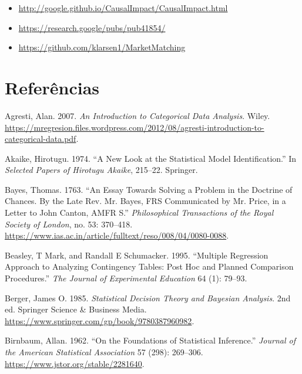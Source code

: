 \documentclass[
]{book}
\providecommand{\tightlist}{%
  \setlength{\itemsep}{0pt}\setlength{\parskip}{0pt}}
\newlength{\cslhangindent}
\newenvironment{cslreferences}%
  {\setlength{\parindent}{0pt}%
  \everypar{\setlength{\hangindent}{\cslhangindent}}\ignorespaces}%
  {\par}
\theoremstyle{definition}
\theoremstyle{definition}
\theoremstyle{definition}
\theoremstyle{remark}
\begin{document}
\begin{itemize}
\tightlist
\item
  \url{http://google.github.io/CausalImpact/CausalImpact.html}
\item
  \url{https://research.google/pubs/pub41854/}
\item
  \url{https://github.com/klarsen1/MarketMatching}
\end{itemize}

\hypertarget{referuxeancias}{%
\chapter{Referências}\label{referuxeancias}}

\hypertarget{refs}{}
\begin{cslreferences}
\leavevmode\hypertarget{ref-agresti2007introduction}{}%
Agresti, Alan. 2007. \emph{An Introduction to Categorical Data Analysis}. Wiley. \url{https://mregresion.files.wordpress.com/2012/08/agresti-introduction-to-categorical-data.pdf}.

\leavevmode\hypertarget{ref-akaike1974new}{}%
Akaike, Hirotugu. 1974. ``A New Look at the Statistical Model Identification.'' In \emph{Selected Papers of Hirotugu Akaike}, 215--22. Springer.

\leavevmode\hypertarget{ref-bayes1763essay}{}%
Bayes, Thomas. 1763. ``An Essay Towards Solving a Problem in the Doctrine of Chances. By the Late Rev. Mr. Bayes, FRS Communicated by Mr. Price, in a Letter to John Canton, AMFR S.'' \emph{Philosophical Transactions of the Royal Society of London}, no. 53: 370--418. \url{https://www.ias.ac.in/article/fulltext/reso/008/04/0080-0088}.

\leavevmode\hypertarget{ref-beasley1995multiple}{}%
Beasley, T Mark, and Randall E Schumacker. 1995. ``Multiple Regression Approach to Analyzing Contingency Tables: Post Hoc and Planned Comparison Procedures.'' \emph{The Journal of Experimental Education} 64 (1): 79--93.

\leavevmode\hypertarget{ref-berger1985statistical}{}%
Berger, James O. 1985. \emph{Statistical Decision Theory and Bayesian Analysis}. 2nd ed. Springer Science \& Business Media. \url{https://www.springer.com/gp/book/9780387960982}.

\leavevmode\hypertarget{ref-birnbaum1962foundations}{}%
Birnbaum, Allan. 1962. ``On the Foundations of Statistical Inference.'' \emph{Journal of the American Statistical Association} 57 (298): 269--306. \url{https://www.jstor.org/stable/2281640}.


\end{cslreferences}
\end{document}
